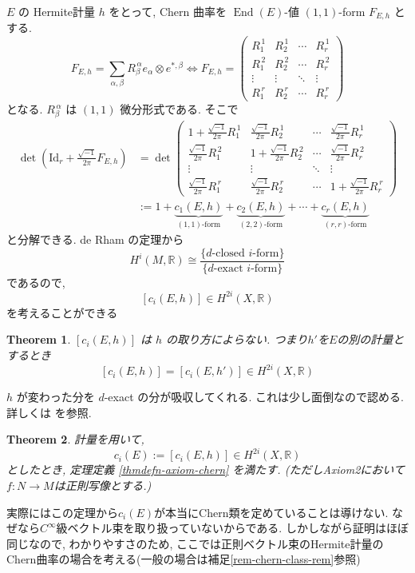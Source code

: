 \documentclass[dvipdfmx,a4paper,11pt]{article} %
\newtheorem{thm}{Theorem}[section]
\theoremstyle{definition}
\theoremstyle{remark}
\numberwithin{equation}{section}
\newcommand{\End}[0]{\operatorname{End}}
\newcommand{\R}{\mathbb{R}}
\begin{document}
\(E\) の Hermite計量 \(h\) をとって, Chern 曲率を \(\End(E)\)-値 \((1,1)\)-form \(F_{E,h}\) とする.
\[
F_{E,h}=
\sum_{\alpha,\beta}R_\beta^{\,\alpha}e_{\alpha} \otimes e^{*,\beta}
\Leftrightarrow 
F_{E,h}
=
\begin{pmatrix}
R_1^{\,1} & R_2^{\,1}& \cdots & R_r^{\,1}\\
R_1^{\,2}&R_2^{\,2}& \cdots & R_r^{\,2}\\
\vdots & \vdots & \ddots & \vdots\\
R_1^{\,r}&R_2^{\,r}& \cdots &R_r^{\,r}
\end{pmatrix}
\]
となる. \(R_\beta^{\,\alpha}\) は \((1,1)\) 微分形式である. そこで
\begin{equation}
\begin{aligned}
\det\left(\mathrm{Id}_r+\frac{\sqrt{-1}}{2\pi }F_{E,h}\right)
&=\det
\begin{pmatrix}
1+\frac{\sqrt{-1}}{2\pi }R_1^{\,1} & \frac{\sqrt{-1}}{2\pi }R_2^{\,1}& \cdots &\frac{\sqrt{-1}}{2\pi } R_r^{\,1}\\
\frac{\sqrt{-1}}{2\pi }R_1^{\,2}&1+\frac{\sqrt{-1}}{2\pi }R_2^{\,2}& \cdots & \frac{\sqrt{-1}}{2\pi }R_r^{\,2}\\
\vdots & \vdots & \ddots & \vdots\\
\frac{\sqrt{-1}}{2\pi }R_1^{\,r}&\frac{\sqrt{-1}}{2\pi }R_2^{\,r}& \cdots &1+\frac{\sqrt{-1}}{2\pi }R_r^{\,r}
\end{pmatrix}
\\
&:=1+\underbrace{c_1(E, h)}_{\text{\((1,1)\)-form}}+
\underbrace{c_2(E, h)}_{\text{\((2,2)\)-form}}+\cdots+
\underbrace{c_r(E, h)}_{\text{\((r,r)\)-form}}
\end{aligned}
\end{equation}
と分解できる. de Rham の定理から
\[
H^{i}(M, \R) \cong \frac{ \{ \text{\(d\)-closed \(i\)-form}\}}{\{ \text{\(d\)-exact \(i\)-form}\}}
\]
であるので,
\[
[c_i(E, h)] \in H^{2i}(X, \R)
\]
を考えることができる
\begin{thm}
\([c_i(E, h)] \) は \(h\) の取り方によらない.
つまり$h'$を$E$の別の計量とするとき
$$
[c_i(E, h)] = [c_i(E, h')]  \in H^{2i}(X, \R)
$$
\end{thm}
\(h\) が変わった分を \(d\)-exact の分が吸収してくれる. これは少し面倒なので認める. 詳しくは \cite[Ch.2 (2.2.5)]{Kob14} を参照.

\begin{thm}
\label{thm-chern-weil}
計量を用いて,
\[
c_i(E):=[c_i(E, h)] \in H^{2i}(X, \R)
\]
としたとき, 定理定義 \ref{thmdefn-axiom-chern} を満たす.
(ただしAxiom2において$f : N \to M$は正則写像とする.)
\end{thm}
実際にはこの定理から$c_i(E)$が本当にChern類を定めていることは導けない. 
なぜなら$C^\infty$級ベクトル束を取り扱っていないからである. 
しかしながら証明はほぼ同じなので, わかりやすさのため, ここでは正則ベクトル束のHermite計量のChern曲率の場合を考える(一般の場合は補足\ref{rem-chern-class-rem}参照)
\end{document}
